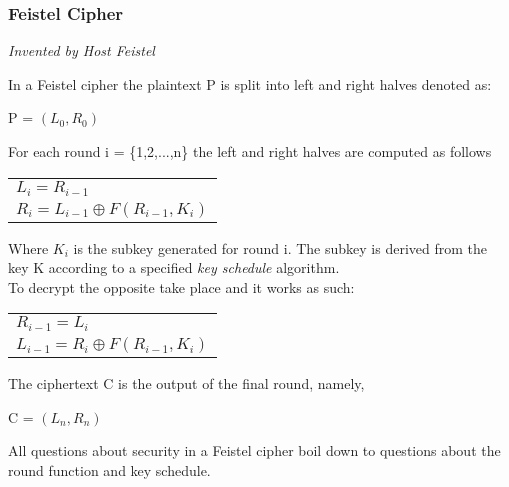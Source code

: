 \documentclass[a4paper]{article}
\begin{document}
\subsubsection{Feistel Cipher}
\begin{center}
    \textit{Invented by Host Feistel}
\end{center}
In a Feistel cipher the plaintext P is split into left and right halves denoted as:
\begin{center}
    P = $(L_0,R_0)$
\end{center}{}
For each round i = \{1,2,...,n\} the left and right halves are computed as follows
\begin{center}
\begin{tabular}{l}
    $L_i = R_{i-1}$\\
    $R_i = L_{i-1} \oplus F(R_{i-1}, K_i) $
\end{tabular}{}
\end{center}{}
Where $K_i$ is the subkey generated for round i. The subkey is derived from the key K according to a specified \textit{key schedule} algorithm.\\
To decrypt the opposite take place and it works as such:
\begin{center}
\begin{tabular}{l}
    $R_{i-1} = L_{i}$\\
    $L_{i-1} = R_i \oplus F(R_{i-1}, K_i) $
\end{tabular}{}
\end{center}{}
The ciphertext C is the output of the final round, namely,
\begin{center}
    C = $(L_n, R_n)$
\end{center}
All questions about security in a Feistel cipher boil down to questions about the round function and key schedule.
\end{document}

